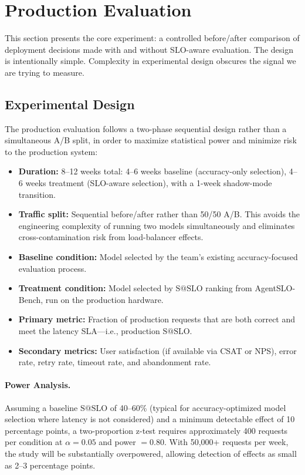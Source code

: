 \documentclass[11pt]{article}
\makeatletter
\newcommand{\sslo}{\ensuremath{\mathrm{S@SLO}}}
\makeatother
\begin{document}
\section{Production Evaluation}
\label{sec:production}

This section presents the core experiment: a controlled before/after comparison of deployment decisions made with and without SLO-aware evaluation. The design is intentionally simple. Complexity in experimental design obscures the signal we are trying to measure.

\subsection{Experimental Design}

The production evaluation follows a two-phase sequential design rather than a simultaneous A/B split, in order to maximize statistical power and minimize risk to the production system:

\begin{itemize}[leftmargin=16pt]
    \item \textbf{Duration:} 8--12 weeks total: 4--6 weeks baseline (accuracy-only selection), 4--6 weeks treatment (SLO-aware selection), with a 1-week shadow-mode transition.
    \item \textbf{Traffic split:} Sequential before/after rather than 50/50 A/B. This avoids the engineering complexity of running two models simultaneously and eliminates cross-contamination risk from load-balancer effects.
    \item \textbf{Baseline condition:} Model selected by the team's existing accuracy-focused evaluation process.
    \item \textbf{Treatment condition:} Model selected by $\sslo{}$ ranking from AgentSLO-Bench, run on the production hardware.
    \item \textbf{Primary metric:} Fraction of production requests that are both correct and meet the latency SLA---i.e., production $\sslo{}$.
    \item \textbf{Secondary metrics:} User satisfaction (if available via CSAT or NPS), error rate, retry rate, timeout rate, and abandonment rate.
\end{itemize}

\paragraph{Power Analysis.} Assuming a baseline $\sslo{}$ of 40--60\% (typical for accuracy-optimized model selection where latency is not considered) and a minimum detectable effect of 10 percentage points, a two-proportion z-test requires approximately 400 requests per condition at $\alpha = 0.05$ and power $= 0.80$. With 50,000+ requests per week, the study will be substantially overpowered, allowing detection of effects as small as 2--3 percentage points.
\end{document}
